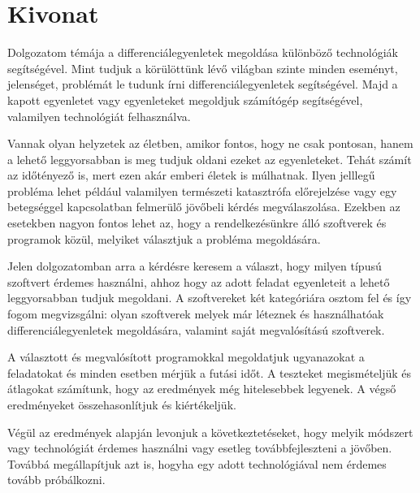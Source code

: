 
\hungarianParagraph


\chapter*{Kivonat}

Dolgozatom témája a differenciálegyenletek megoldása különböző technológiák segítségével. Mint tudjuk a körülöttünk lévő világban szinte minden eseményt, jelenséget, problémát le tudunk írni differenciálegyenletek segítségével. Majd a kapott egyenletet vagy egyenleteket megoldjuk számítógép segítségével, valamilyen technológiát felhasználva.

Vannak olyan helyzetek az életben, amikor fontos, hogy ne csak pontosan, hanem a lehető leggyorsabban is meg tudjuk oldani ezeket az egyenleteket. Tehát számít az időtényező is, mert ezen akár emberi életek is múlhatnak. Ilyen jelllegű probléma lehet például valamilyen természeti katasztrófa előrejelzése vagy egy betegséggel kapcsolatban felmerülő jövőbeli kérdés megválaszolása. Ezekben az esetekben nagyon fontos lehet az, hogy a rendelkezésünkre álló szoftverek és programok közül, melyiket választjuk a probléma megoldására.

Jelen dolgozatomban arra a kérdésre keresem a választ, hogy milyen típusú szoftvert érdemes használni, ahhoz hogy az adott feladat egyenleteit a lehető leggyorsabban tudjuk megoldani. A szoftvereket két kategóriára osztom fel és így fogom megvizsgálni: olyan szoftverek melyek már léteznek és használhatóak differenciálegyenletek megoldására, valamint saját megvalósítású szoftverek.

A választott és megvalósított programokkal megoldatjuk ugyanazokat a feladatokat és minden esetben mérjük a futási időt. A teszteket megismételjük és átlagokat számítunk, hogy az eredmények még hitelesebbek legyenek. A végső eredményeket összehasonlítjuk és kiértékeljük.

Végül az eredmények alapján levonjuk a következtetéseket, hogy melyik módszert vagy technológiát érdemes használni vagy esetleg továbbfejleszteni a jövőben. Továbbá megállapítjuk azt is, hogyha egy adott technológiával nem érdemes tovább próbálkozni.
\vspace*{2cm}

